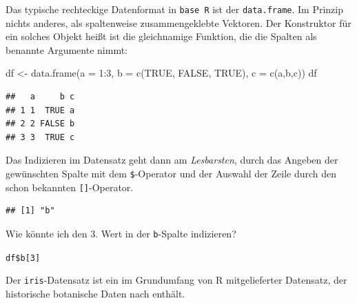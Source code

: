 \documentclass[
]{book}
\newenvironment{Shaded}{\begin{snugshade}}{\end{snugshade}}
\newcommand{\AttributeTok}[1]{\textcolor[rgb]{0.77,0.63,0.00}{#1}}
\newcommand{\ConstantTok}[1]{\textcolor[rgb]{0.00,0.00,0.00}{#1}}
\newcommand{\DecValTok}[1]{\textcolor[rgb]{0.00,0.00,0.81}{#1}}
\newcommand{\DocumentationTok}[1]{\textcolor[rgb]{0.56,0.35,0.01}{\textbf{\textit{#1}}}}
\newcommand{\FunctionTok}[1]{\textcolor[rgb]{0.00,0.00,0.00}{#1}}
\newcommand{\NormalTok}[1]{#1}
\newcommand{\OtherTok}[1]{\textcolor[rgb]{0.56,0.35,0.01}{#1}}
\newcommand{\SpecialCharTok}[1]{\textcolor[rgb]{0.00,0.00,0.00}{#1}}
\newcommand{\StringTok}[1]{\textcolor[rgb]{0.31,0.60,0.02}{#1}}
\begin{document}
Das typische rechteckige Datenformat in \texttt{base\ R} ist der \texttt{data.frame}. Im Prinzip nichts anderes, als spaltenweise zusammengeklebte Vektoren.
Der Konstruktor für ein solches Objekt heißt ist die gleichnamige Funktion, die die Spalten als benannte Argumente nimmt:

\begin{Shaded}
\begin{Highlighting}[]
\NormalTok{df }\OtherTok{\textless{}{-}} \FunctionTok{data.frame}\NormalTok{(}\AttributeTok{a =} \DecValTok{1}\SpecialCharTok{:}\DecValTok{3}\NormalTok{,}
                 \AttributeTok{b =} \FunctionTok{c}\NormalTok{(}\ConstantTok{TRUE}\NormalTok{, }\ConstantTok{FALSE}\NormalTok{, }\ConstantTok{TRUE}\NormalTok{),}
                 \AttributeTok{c =} \FunctionTok{c}\NormalTok{(}\StringTok{\textquotesingle{}a\textquotesingle{}}\NormalTok{,}\StringTok{\textquotesingle{}b\textquotesingle{}}\NormalTok{,}\StringTok{\textquotesingle{}c\textquotesingle{}}\NormalTok{))}
\NormalTok{df}
\end{Highlighting}
\end{Shaded}

\begin{verbatim}
##   a     b c
## 1 1  TRUE a
## 2 2 FALSE b
## 3 3  TRUE c
\end{verbatim}

Das Indizieren im Datensatz geht dann am \emph{Lesbarsten}, durch das Angeben der gewünschten Spalte mit dem \texttt{\$}-Operator und der Auswahl der Zeile durch den schon bekannten \texttt{{[}{]}}-Operator.

\begin{Shaded}
\end{Shaded}

\begin{verbatim}
## [1] "b"
\end{verbatim}

Wie könnte ich den 3. Wert in der \texttt{b}-Spalte indizieren?

\texttt{df\$b{[}3{]}}

Der \texttt{iris}-Datensatz ist ein im Grundumfang von R mitgelieferter Datensatz, der historische botanische Daten nach \citet{andersonIrisesGaspePeninsula1935} enthält.
\end{document}
